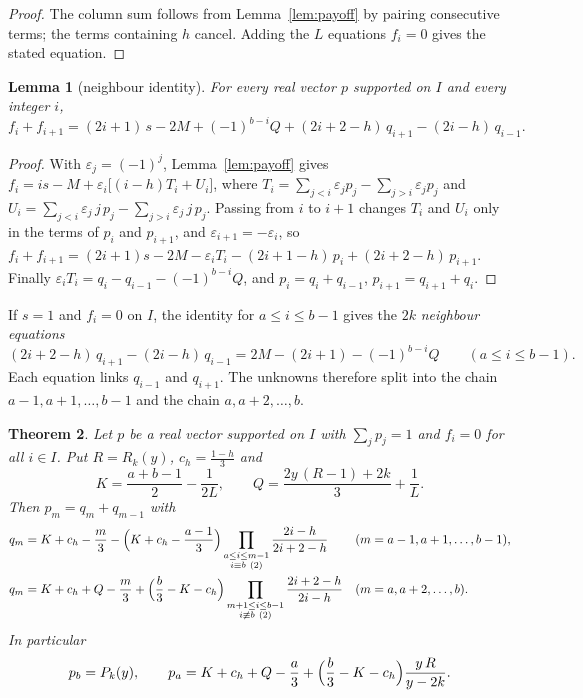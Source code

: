 \documentclass[11pt]{article}
\newtheorem{theorem}{Theorem}[section]
\newtheorem{lemma}[theorem]{Lemma}
\theoremstyle{definition}
\theoremstyle{remark}
\begin{document}
\begin{proof}
The column sum follows from Lemma~\ref{lem:payoff} by pairing
consecutive terms; the terms containing $h$ cancel. Adding the $L$
equations $f_i=0$ gives the stated equation.
\end{proof}

\begin{lemma}[neighbour identity]\label{lem:neighbour}
For every real vector $p$ supported on $I$ and every integer $i$,
\[
f_i+f_{i+1}=(2i+1)\,s-2M+(-1)^{b-i}Q+(2i+2-h)\,q_{i+1}-(2i-h)\,q_{i-1}.
\]
\end{lemma}

\begin{proof}
With $\varepsilon_j=(-1)^j$, Lemma~\ref{lem:payoff} gives
$f_i=is-M+\varepsilon_i\bigl[(i-h)T_i+U_i\bigr]$, where
$T_i=\sum_{j<i}\varepsilon_jp_j-\sum_{j>i}\varepsilon_jp_j$ and
$U_i=\sum_{j<i}\varepsilon_j\,j\,p_j-\sum_{j>i}\varepsilon_j\,j\,p_j$.
Passing from $i$ to $i+1$ changes $T_i$ and $U_i$ only in the terms of
$p_i$ and $p_{i+1}$, and $\varepsilon_{i+1}=-\varepsilon_i$, so
$f_i+f_{i+1}=(2i+1)s-2M-\varepsilon_iT_i-(2i+1-h)\,p_i+(2i+2-h)\,p_{i+1}$.
Finally $\varepsilon_iT_i=q_i-q_{i-1}-(-1)^{b-i}Q$, and
$p_i=q_i+q_{i-1}$, $p_{i+1}=q_{i+1}+q_i$.
\end{proof}

If $s=1$ and $f_i=0$ on $I$, the identity for $a\le i\le b-1$ gives the
$2k$ \emph{neighbour equations}
\begin{equation}\label{eq:neighbour}
(2i+2-h)\,q_{i+1}-(2i-h)\,q_{i-1}=2M-(2i+1)-(-1)^{b-i}Q
\qquad(a\le i\le b-1).
\end{equation}
Each equation links $q_{i-1}$ and $q_{i+1}$. The unknowns therefore split
into the chain $a-1,a+1,\dots,b-1$ and the chain $a,a+2,\dots,b$.

\begin{theorem}\label{thm:interval}
Let $p$ be a real vector supported on $I$ with $\sum_jp_j=1$ and $f_i=0$
for all $i\in I$. Put $R=R_k(y)$, $c_h=\frac{1-h}3$ and
\[
K=\frac{a+b-1}2-\frac1{2L},\qquad
Q=\frac{2y\,(R-1)+2k}3+\frac1L .
\]
Then $p_m=q_m+q_{m-1}$ with
\begin{align}
q_m&=K+c_h-\frac m3-\Bigl(K+c_h-\frac{a-1}3\Bigr)
\prod_{\substack{a\le i\le m-1\\ i\equiv b\ (2)}}\frac{2i-h}{2i+2-h}
&&(m=a-1,a+1,\dots,b-1),\label{eq:chain1}\\
q_m&=K+c_h+Q-\frac m3+\Bigl(\frac b3-K-c_h\Bigr)
\prod_{\substack{m+1\le i\le b-1\\ i\not\equiv b\ (2)}}\frac{2i+2-h}{2i-h}
&&(m=a,a+2,\dots,b).\label{eq:chain2}
\end{align}
In particular
\[
p_b=P_k(y),\qquad
p_a=K+c_h+Q-\frac a3+\Bigl(\frac b3-K-c_h\Bigr)\frac{y\,R}{y-2k}.
\]
\end{theorem}
\end{document}
